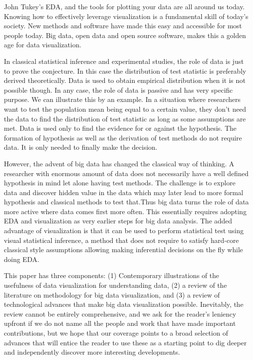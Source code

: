 \documentclass{article}
\begin{document}
John Tukey's EDA, and the tools for plotting your data are all around us today. Knowing how to effectively leverage visualization is a fundamental skill of today's society. New methods and software have made this easy and accessible for most people today. Big data, open data and open source software, makes this a golden age for data visualization. 

{\color[rgb]{1,0,0} In classical statistical inference and experimental studies, the role of data is just to prove the conjecture. In this case the distribution of test statistic is preferably derived theoretically. Data is used to obtain empirical distribution when it is not possible though. In any case, the role of data is passive and has very specific purpose. We can illustrate this by an example. In a situation where researchers want to test the population mean being equal to a certain value, they don't need the data to find the distribution of test statistic as long as some assumptions are met. Data is used only to find the evidence for or against the hypothesis. The formation of hypothesis as well as the derivation of test methods do not require data. It is only needed to finally make the decision.

However, the advent of big data has changed the classical way of thinking. A researcher with enormous amount of data does not necessarily have a well defined hypothesis in mind let alone having test methods. The challenge is to explore data and discover hidden value in the data which may later lead to more formal hypothesis and classical methods to test that.Thus big data turns the role of data more active where data comes first more often. This essentially requires adopting EDA and visualization as very earlier steps for big data analysis. The added advantage of visualization is that it can be used to perform statistical test using visual statistical inference, a method that does not require to satisfy hard-core classical style assumptions allowing making inferential decisions on the fly while doing EDA.}

This paper has three components: (1) Contemporary illustrations of the usefulness of data visualization for understanding data, (2) a review of the literature on methodology for big data visualization, and (3) a review of technological advances that make big data visualization possible. Inevitably, the review cannot be entirely comprehensive, and we ask for the reader's leniency upfront if we do not name all the people and work that have made important contributions, but we hope that our coverage points to a broad selection of advances that will entice the reader to use these as a starting point to dig deeper and independently discover more interesting developments.  
\end{document}
